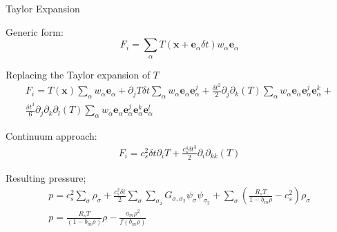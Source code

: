 \documentclass[8pt]{beamer}
\newcommand{\locx}{\mathbf{x}}
\newcommand{\vele}{\mathbf{e}_\alpha}
\begin{document}
	\begin{frame}{Taylor Expansion}
		
		Generic form:
		\begin{equation*}
		F_i = \sum_\alpha T (\locx + \vele \delta t)  w_\alpha \vele
		\end{equation*}
		
		Replacing the Taylor expansion of $T$
		\begin{equation*}
		\begin{split}
		F_i = 
		T(\mathbf{x}) \sum_\alpha w_\alpha \vele + \partial_j T \delta t \sum_\alpha w_\alpha \vele\vele^j + \frac{\delta t^2}{2} \partial_j \partial_k (T) \sum_\alpha w_\alpha \vele \vele^j \vele^k + \\\frac{\delta t^3}{6} \partial_j \partial_k \partial_l (T) \sum_\alpha w_\alpha \vele \vele^j \vele^k \vele^l 
		\end{split}
		\end{equation*}
		
		Continuum approach: \begin{equation*}\label{eq:taylorExpansion}
		\begin{split}
		F_i = c_s^2 \delta t  \partial_i T  + \frac{c_s^4\delta t^3}{2} \partial_i \partial_{kk} (T) 
		\end{split}
		\end{equation*}
		
		Resulting pressure;
		\begin{equation*}\label{eq:pressureLBMPseudoP}
		\begin{split}
		p = c_s^2 \sum_\sigma \rho_\sigma + \frac{c_s^2 \delta t}{2} \sum_\sigma \sum_{\sigma_2} G_{\sigma,\sigma_2} \psi_\sigma \psi_{\sigma_2} + \sum_\sigma   (\frac{R_sT}{1-b_m \rho} - c_s^2) \rho_\sigma \\ p =  \frac{R_sT}{(1-b_m \rho)} \rho - \frac{a_m \rho^2}{f(b_m \rho)}
		\end{split}
		\end{equation*}
	\end{frame}
\end{document}

